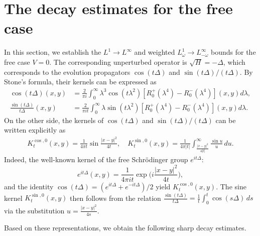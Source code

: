 \documentclass[reqno]{amsart}
\numberwithin{equation}{section}
\begin{document}
\section{The decay estimates for the free case}\label{sec:free_case}
In this section, we establish the $L^1 \to L^{\infty}$ and weighted $L^1_\omega \to L^{\infty}_{-\omega}$ bounds for the free case $V=0$. The corresponding unperturbed operator is $\sqrt{H}=-\Delta$,  which corresponds to the evolution propagators $\cos(t\Delta)$ and $\sin(t\Delta)/(t\Delta)$. 
  By Stone's formula, their kernels can be expressed as
 \begin{align}\label{free-stone_cos}
    \cos (t\Delta)(x,y) & =\frac{2}{\pi i} \int_0^{\infty} \lambda^3 \cos (t \lambda^2)\left[R_0^{+}(\lambda^4)-R_0^{-}(\lambda^4)\right](x,y)  d \lambda,\\
    \label{free-stone_sin}
     \frac{\sin (t \Delta)}{t\Delta}(x,y) & =\frac{2}{\pi i t} \int_0^{\infty} \lambda \sin (t \lambda^2)\left[R_0^{+}(\lambda^4)-R_0^{-}(\lambda^4)\right](x,y) d \lambda.
     \end{align}
On the other side, the kernels of $\cos(t\Delta)$ and $\sin(t\Delta)/(t\Delta)$ can be written explicitly as
\begin{align}\label{eq:free_kernels}
K_t^{\cos,0}(x,y) = \frac{1}{4\pi t} \sin \frac{|x-y|^2}{4t},\quad
K_t^{\sin,0}(x,y) =\frac{1}{4\pi |t|}\int_{\frac{|x-y|^2}{4|t|}}^{\infty}\frac{\sin u}{u}\,du .
\end{align}
Indeed, the well-known  kernel of the free Schr\"{o}dinger group \(e^{it\Delta}\): $$e^{it\Delta}(x,y) = \frac{1}{4\pi i t} \exp\bigl(i\frac{|x-y|^2}{4t}\bigr),$$ and the identity $\cos(t\Delta) = (e^{it\Delta}+e^{-it\Delta})/2$ yield $K_t^{\cos,0}(x,y)$. The sine kernel $K_t^{\sin,0}(x,y)$ then follows  from the  relation $\frac{\sin(t\Delta)}{t\Delta} = \frac{1}{t} \int_0^t \cos(s\Delta)\,ds$ via the substitution $u = \frac{|x-y|^2}{4s}$.

Based on these representations, we obtain the following sharp decay estimates.
\end{document}

